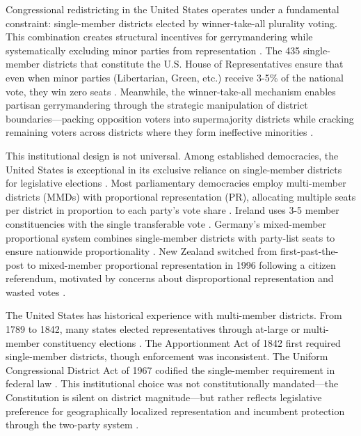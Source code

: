 
Congressional redistricting in the United States operates under a fundamental constraint: single-member districts elected by winner-take-all plurality voting. This combination creates structural incentives for gerrymandering while systematically excluding minor parties from representation \citep{amy2000real, mcgann2016gerrymandering}. The 435 single-member districts that constitute the U.S. House of Representatives ensure that even when minor parties (Libertarian, Green, etc.) receive 3-5\% of the national vote, they win zero seats \citep{cox1997making}. Meanwhile, the winner-take-all mechanism enables partisan gerrymandering through the strategic manipulation of district boundaries—packing opposition voters into supermajority districts while cracking remaining voters across districts where they form ineffective minorities \citep{stephanopoulos2015partisan}.

This institutional design is not universal. Among established democracies, the United States is exceptional in its exclusive reliance on single-member districts for legislative elections \citep{farrell2011electoral}. Most parliamentary democracies employ multi-member districts (MMDs) with proportional representation (PR), allocating multiple seats per district in proportion to each party's vote share \citep{lijphart1994electoral}. Ireland uses 3-5 member constituencies with the single transferable vote \citep{gallagher2011ireland}. Germany's mixed-member proportional system combines single-member districts with party-list seats to ensure nationwide proportionality \citep{shugart2017mixed}. New Zealand switched from first-past-the-post to mixed-member proportional representation in 1996 following a citizen referendum, motivated by concerns about disproportional representation and wasted votes \citep{denemark2001origins}.

The United States has historical experience with multi-member districts. From 1789 to 1842, many states elected representatives through at-large or multi-member constituency elections \citep{zagarri1987politics}. The Apportionment Act of 1842 first required single-member districts, though enforcement was inconsistent. The Uniform Congressional District Act of 1967 codified the single-member requirement in federal law \citep{griffith1907rise}. This institutional choice was not constitutionally mandated—the Constitution is silent on district magnitude—but rather reflects legislative preference for geographically localized representation and incumbent protection through the two-party system \citep{amy2000real}.


